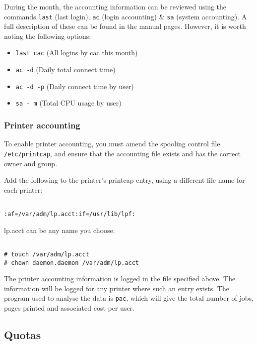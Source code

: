 During the month, the accounting information can be reviewed using the commands
{\tt last} (last login), {\tt ac} (login accounting) \& {\tt sa} (system accounting).
A full description of these can be found in the manual pages. However, it is 
worth noting the following options:

\begin{itemize}

\item {\tt last cac} (All logins by cac this month)

\item {\tt ac -d} (Daily total connect time)

\item {\tt ac -d -p} (Daily connect time by user)

\item {\tt sa - m} (Total CPU usage by user)

\end{itemize}

\subsubsection{Printer accounting}

To enable printer accounting, you must amend the spooling control file
{\tt /etc/printcap}, and ensure that the accounting file exists and has the correct
owner and group. 

Add the following to the printer's printcap entry, using a different
file name for each printer:

\begin{verbatim}

:af=/var/adm/lp.acct:if=/usr/lib/lpf:

\end{verbatim}

lp.acct can be any name you choose.

\begin{verbatim}

# touch /var/adm/lp.acct
# chown daemon.daemon /var/adm/lp.acct

\end{verbatim}

The printer accounting information is logged in the file specified above.
The information will be logged for any printer where such an entry exists.
The program used to analyse the data is {\tt pac}, which will give the total 
number of jobs, pages printed and associated cost per user.

\subsection{Quotas}

